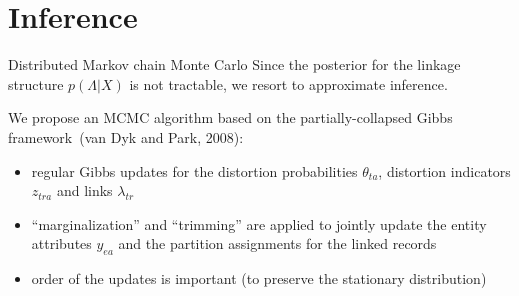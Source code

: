 \documentclass[compress]{beamer}
\newcommand{\1}[1]{\mathbb{I}\!\left[#1\right]} %
\theoremstyle{plain}
\begin{document}

\section{Inference}
\begin{frame}{Distributed Markov chain Monte Carlo}
  Since the posterior for the linkage structure $p(\Lambda | X)$ is not 
  tractable, we resort to \alert{approximate inference}.
  \vspace*{1em}
  \pause

  We propose an MCMC algorithm based on the \alert{partially-collapsed Gibbs} 
  framework~(van Dyk and Park, 2008):
  \begin{itemize}
    \item regular Gibbs updates for the distortion probabilities $\theta_{ta}$, 
    distortion indicators $z_{tra}$ and links $\lambda_{tr}$
    \item ``marginalization'' and ``trimming'' are applied to jointly update 
    the entity attributes $y_{ea}$ and the partition assignments for the 
    linked records
    \item order of the updates is important (to preserve the stationary 
    distribution)
  \end{itemize}
\end{frame}
\end{document}
